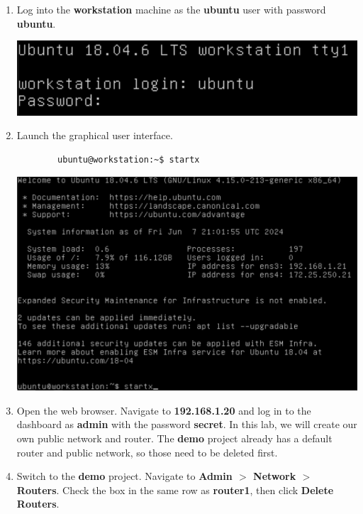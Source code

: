 \documentclass[letterpaper, 12pt]{article}
\begin{document}
\begin{enumerate}
    \item Log into the \textbf{workstation} machine as the \textbf{ubuntu} user with password \textbf{ubuntu}.

    \begin{center}
        \includegraphics[width=\linewidth]{images/part1/step1.png}
    \end{center}

    \item Launch the graphical user interface.
    \begin{lstlisting}
        ubuntu@workstation:~$ startx
    \end{lstlisting}

    \begin{center}
        \includegraphics[width=\linewidth]{images/part1/step2.png}
    \end{center}

    \item Open the web browser.
    Navigate to \textbf{192.168.1.20} and log in to the dashboard as \textbf{admin} with the password \textbf{secret}.
    In this lab, we will create our own public network and router.
    The \textbf{demo} project already has a default router and public network, so those need to be deleted first.

    \item Switch to the \textbf{demo} project.
    Navigate to \textbf{Admin $>$ Network $>$ Routers}.
    Check the box in the same row as \textbf{router1}, then click \textbf{Delete Routers}.


\end{enumerate}
\end{document}
